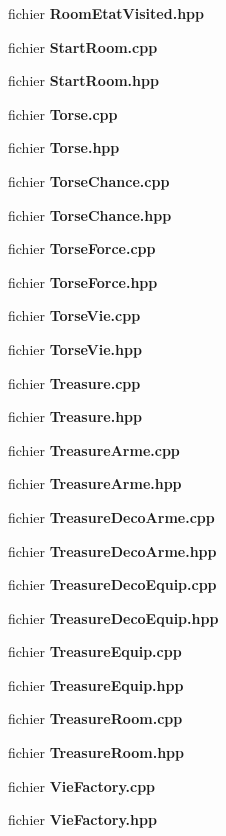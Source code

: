 \begin{DoxyCompactItemize}
fichier {\bf Room\-Etat\-Visited.\-hpp}
\item 
fichier {\bf Start\-Room.\-cpp}
\item 
fichier {\bf Start\-Room.\-hpp}
\item 
fichier {\bf Torse.\-cpp}
\item 
fichier {\bf Torse.\-hpp}
\item 
fichier {\bf Torse\-Chance.\-cpp}
\item 
fichier {\bf Torse\-Chance.\-hpp}
\item 
fichier {\bf Torse\-Force.\-cpp}
\item 
fichier {\bf Torse\-Force.\-hpp}
\item 
fichier {\bf Torse\-Vie.\-cpp}
\item 
fichier {\bf Torse\-Vie.\-hpp}
\item 
fichier {\bf Treasure.\-cpp}
\item 
fichier {\bf Treasure.\-hpp}
\item 
fichier {\bf Treasure\-Arme.\-cpp}
\item 
fichier {\bf Treasure\-Arme.\-hpp}
\item 
fichier {\bf Treasure\-Deco\-Arme.\-cpp}
\item 
fichier {\bf Treasure\-Deco\-Arme.\-hpp}
\item 
fichier {\bf Treasure\-Deco\-Equip.\-cpp}
\item 
fichier {\bf Treasure\-Deco\-Equip.\-hpp}
\item 
fichier {\bf Treasure\-Equip.\-cpp}
\item 
fichier {\bf Treasure\-Equip.\-hpp}
\item 
fichier {\bf Treasure\-Room.\-cpp}
\item 
fichier {\bf Treasure\-Room.\-hpp}
\item 
fichier {\bf Vie\-Factory.\-cpp}
\item 
fichier {\bf Vie\-Factory.\-hpp}
\end{DoxyCompactItemize}
